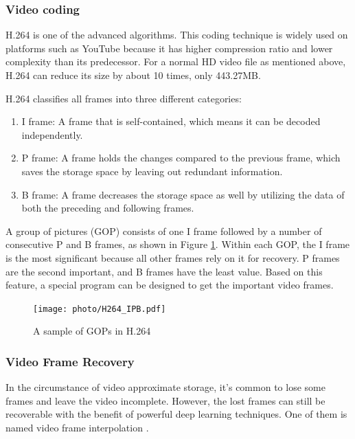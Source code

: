 \documentclass[sigconf]{acmart}
\begin{document}
\subsubsection{Video coding}
H.264 \cite{wiegand2003overview} is one of the advanced algorithms. This coding technique is widely used on platforms such as YouTube because it has higher compression ratio and lower complexity than its predecessor. For a normal HD video file as mentioned above, H.264 can reduce its size by about 10 times, only 443.27MB.

H.264 classifies all frames into three different categories:
\begin{enumerate}
    \item I frame: A frame that is self-contained, which means it can be decoded independently.
    \item P frame: A frame holds the changes compared to the previous frame, which saves the storage space by leaving out redundant information.
    \item B frame: A frame decreases the storage space as well by utilizing the data of both the preceding and following frames.
\end{enumerate}
A group of pictures (GOP) consists of one I frame followed by a number of consecutive P and B frames, as shown in Figure \ref{H264-IPB}.
Within each GOP, the I frame is the most significant because all other frames rely on it for recovery. P frames are the second important, and B frames have the least value.
Based on this feature, a special program can be designed to get the important video frames.

\begin{figure}[ht]
\centering
\texttt{[image: photo/H264\_IPB.pdf]}
\caption{A sample of GOPs in H.264}
\label{H264-IPB}
\end{figure}

\subsubsection{Video Frame Recovery}
In the circumstance of video approximate storage, it's common to lose some frames and leave the video incomplete. However, the lost frames can still be recoverable with the benefit of powerful deep learning techniques. One of them is named video frame interpolation \cite{meyer2015phase, niklaus2018context, van2017frame}.

\end{document}
